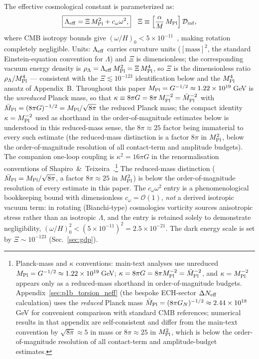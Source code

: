\documentclass[aps,prd,twocolumn,superscriptaddress,showpacs,preprintnumbers,nofootinbib,longbibliography,floatfix]{revtex4-2}
\newcommand{\Leff}{\Lambda_{\rm eff}}
\newcommand{\Dinf}{\mathcal{D}_{\rm inf}}
\newcommand{\MPl}{M_{\rm Pl}}
\newcommand{\Neff}{N_{\rm eff}}
\begin{document}
The effective cosmological constant is parameterized as:
\begin{align}\label{eq:Leff_full}
\boxed{\Leff = \Xi\,\MPl^2 + c_\omega\omega^2,}\quad
\Xi\equiv \left[\frac{\alpha}{M}\,\MPl\right]\Dinf,
\end{align}
where CMB isotropy bounds give $(\omega/H)_0 < 5\times 10^{-11}$~\cite{Saadeh2016},
making rotation completely negligible. Units: $\Leff$ carries curvature
units ($[\text{mass}]^2$, the standard Einstein-equation convention for
$\Lambda$) and $\Xi$ is dimensionless; the corresponding vacuum energy
density is $\rho_\Lambda = \Leff\,\MPl^2 = \Xi\,\MPl^4$, so $\Xi$ is the
dimensionless ratio $\rho_\Lambda/\MPl^4$ --- consistent with the
$\Xi \lesssim 10^{-123}$ identification below and the $\MPl^4$ ansatz of
Appendix~B. Throughout this paper $\MPl = G^{-1/2} \approx
1.22\times 10^{19}\,$GeV is the \emph{unreduced} Planck mass, so that
$\kappa \equiv 8\pi G = 8\pi\,\MPl^{-2} = \bar M_{\rm Pl}^{-2}$ with
$\bar M_{\rm Pl}=(8\pi G)^{-1/2}=\MPl/\sqrt{8\pi}$ the reduced Planck mass;
the compact identity $\kappa=M_{\rm Pl}^{-2}$ used as shorthand in the
order-of-magnitude estimates below is understood in this reduced-mass sense,
the $8\pi\approx25$ factor being immaterial to every such estimate
(the reduced-mass distinction is a factor $8\pi$ in $M_{\rm Pl}^2$, below the
order-of-magnitude resolution of all contact-term and amplitude budgets). The
companion one-loop coupling is $\kappa^2 = 16\pi G$ in the renormalisation
conventions of Shapiro~\&~Teixeira~\cite{ShapiroTeixeira2014}.\footnote{Planck-mass and
$\kappa$ conventions: main-text analyses use unreduced $\MPl=G^{-1/2}
\approx1.22\times10^{19}\,$GeV; $\kappa=8\pi G=8\pi\MPl^{-2}=\bar M_{\rm Pl}^{-2}$, and
$\kappa=M_{\rm Pl}^{-2}$ appears only as a reduced-mass shorthand in order-of-magnitude budgets.
Appendix~\ref{sec:p1b_torsion_neff} (the bespoke ECH-sector $\Delta\Neff$
calculation) uses the \emph{reduced} Planck mass
$\bar M_{\rm Pl}=(8\pi G_N)^{-1/2}\approx2.44\times10^{18}$\,GeV for
convenient comparison with standard CMB references; numerical results in
that appendix are self-consistent and differ from the main-text convention
by $\sqrt{8\pi}\approx5$ in mass or $8\pi\approx25$ in $M_{\rm Pl}^2$,
which is below the order-of-magnitude resolution of all contact-term and
amplitude-budget estimates.}
The reduced-mass distinction ($\bar M_{\rm Pl} = \MPl/\sqrt{8\pi}$, a factor
$8\pi \approx 25$ in $\MPl^2$) is below the order-of-magnitude resolution
of every estimate in this paper. The $c_\omega\omega^2$ entry is a
phenomenological bookkeeping bound with dimensionless
$c_\omega = \mathcal{O}(1)$, \emph{not} a derived isotropic vacuum term:
in rotating (Bianchi-type) cosmologies vorticity sources anisotropic
stress rather than an isotropic $\Lambda$, and the entry is retained
solely to demonstrate negligibility,
$(\omega/H)_0^2 < (5\times 10^{-11})^2 = 2.5\times 10^{-21}$.
The dark energy scale is set by
$\Xi \sim 10^{-123}$ (Sec.~\ref{sec:gdp}).
\end{document}

